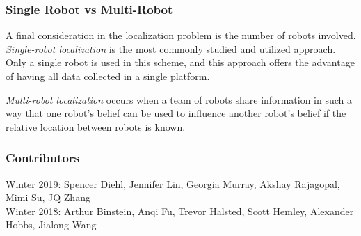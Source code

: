 \documentclass[twoside]{article}
\begin{document}
    \subsubsection{Single Robot vs Multi-Robot}
    A final consideration in the localization problem is the number of robots involved. \textit{Single-robot localization} is the most commonly studied and utilized approach. Only a single robot is used in this scheme, and this approach offers the advantage of having all data collected in a single platform.
    
    \textit{Multi-robot localization} occurs when a team of robots share information in such a way that one robot's belief can be used to influence another robot's belief if the relative location between robots is known. 




\printbibliography

\subsubsection*{Contributors}
Winter 2019: Spencer Diehl, Jennifer Lin, Georgia Murray, Akshay Rajagopal, Mimi Su, JQ Zhang \\
Winter 2018: Arthur Binstein, Anqi Fu, Trevor Halsted, Scott Hemley, Alexander Hobbs, Jialong Wang
\end{document}
